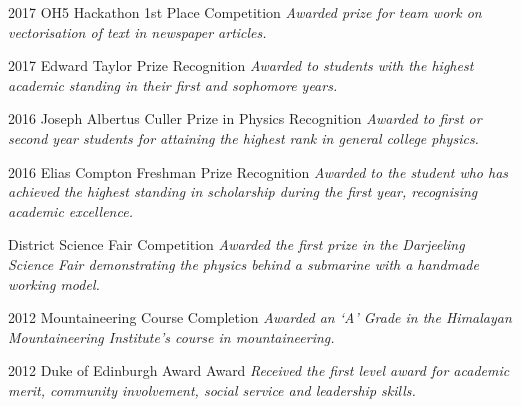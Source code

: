 \documentclass[]{friggeri-cv}
\begin{document}
\begin{entrylist}
    \entry
    {2017}
    {OH5 Hackathon 1st Place}
    {Competition}
    {\emph{Awarded prize for team work on vectorisation of text in newspaper articles.}\\}

    \entry
    {2017}
    {Edward Taylor Prize}
    {Recognition}
    {\emph{Awarded to students with the highest academic standing in their first and sophomore years.}\\}

     \entry
    {2016}
    {Joseph Albertus Culler Prize in Physics}
    {Recognition}
    { \emph{Awarded to first or second year students for attaining the highest rank in general college physics. }\\}



    \entry
    {2016}
    {Elias Compton Freshman Prize}
    {Recognition}
    { \emph{Awarded to the student who has achieved the highest standing in scholarship during the first year, recognising academic excellence. }\\}

    \end{entrylist}
   \begin{entrylist}
    {District Science Fair}
    {Competition}
    {\emph{Awarded the first prize in the Darjeeling Science Fair demonstrating the physics behind a submarine with a handmade working model.\\}}

    \end{entrylist}
   \begin{entrylist}
    \entry
    {2012}
    {Mountaineering Course}
    {Completion}
    { \emph{Awarded an ‘A’ Grade in the Himalayan Mountaineering Institute’s course in mountaineering.}\\}

      \entry
    {2012}
    {Duke of Edinburgh Award}
    {Award}
    { \emph{Received the first level award for academic merit, community involvement, social service and leadership skills.}\\}

\end{entrylist}


\newpage
\end{document}
